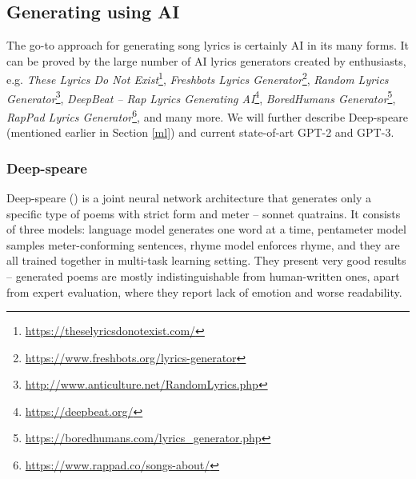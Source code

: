 \subsection{Generating using AI}
The go-to approach for generating song lyrics is certainly AI in its many forms.
It can be proved by the large number of AI lyrics generators created by enthusiasts, e.g. \textit{These Lyrics Do Not Exist}\footnote{\url{https://theselyricsdonotexist.com/}}, \textit{Freshbots Lyrics Generator}\footnote{\url{https://www.freshbots.org/lyrics-generator}}, \textit{Random Lyrics Generator}\footnote{\url{http://www.anticulture.net/RandomLyrics.php}}, \textit{DeepBeat -- Rap Lyrics Generating AI}\footnote{\url{https://deepbeat.org/}}, \textit{BoredHumans Generator}\footnote{\url{https://boredhumans.com/lyrics_generator.php}}, \textit{RapPad Lyrics Generator}\footnote{\url{https://www.rappad.co/songs-about/}}, and many more. We will further describe Deep-speare (mentioned earlier in Section \ref{ml}) and current state-of-art GPT-2 and GPT-3.

\subsubsection*{Deep-speare}
Deep-speare (\cite{lau2018deep}) is a joint neural network architecture that generates only a specific type of poems with strict form and meter -- \gls{sonnet} \gls{quatrain}s. It consists of three models: language model generates one word at a time, pentameter model samples meter-conforming sentences, rhyme model enforces rhyme, and they are all trained together in multi-task learning setting. They present very good results -- generated poems are mostly indistinguishable from human-written ones, apart from expert evaluation, where they report lack of emotion and worse readability.

